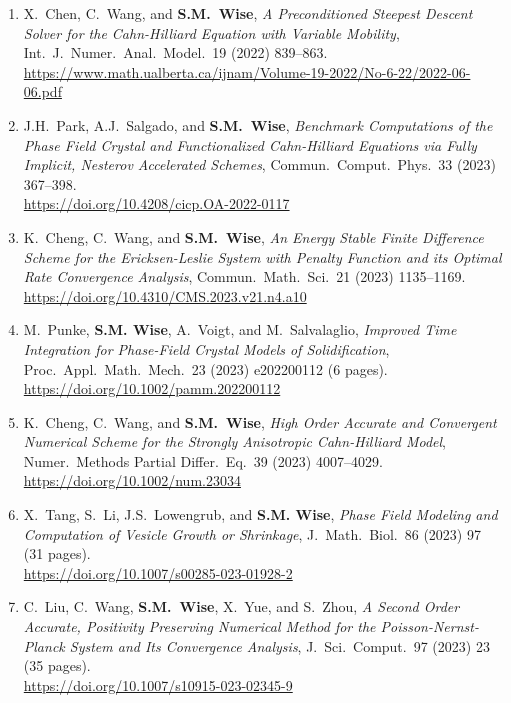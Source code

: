 \documentclass[10pt,letterpaper]{article}
\begin{document}
\begin{enumerate}
	\item
X.~Chen, C.~Wang, and \textbf{S.M.~Wise}, {\sl A Preconditioned Steepest Descent Solver for the Cahn-Hilliard Equation with Variable Mobility}, Int.~J.~Numer.~Anal.~Model.~19 (2022) 839--863.
	\\
\url{https://www.math.ualberta.ca/ijnam/Volume-19-2022/No-6-22/2022-06-06.pdf}

	\item
J.H.~Park, A.J.~Salgado, and \textbf{S.M.~Wise}, {\sl Benchmark Computations of the Phase Field Crystal and Functionalized Cahn-Hilliard Equations via Fully Implicit, Nesterov Accelerated Schemes}, Commun.~Comput.~Phys.~33 (2023) 367--398.
	\\
\url{https://doi.org/10.4208/cicp.OA-2022-0117}

	\item
K.~Cheng, C.~Wang, and \textbf{S.M.~Wise}, {\sl An Energy Stable Finite Difference Scheme for the Ericksen-Leslie System with Penalty Function and its Optimal Rate Convergence Analysis}, Commun.~Math.~Sci.~21 (2023)  1135--1169.
	\\
\url{https://doi.org/10.4310/CMS.2023.v21.n4.a10}

	\item
M.~Punke, \textbf{S.M. Wise}, A.~Voigt, and M.~Salvalaglio, {\sl Improved Time Integration for Phase-Field Crystal Models of Solidification}, Proc.~Appl.~Math.~Mech.~23 (2023) e202200112 (6 pages).
	\\
\url{https://doi.org/10.1002/pamm.202200112}

	\item
K.~Cheng, C.~Wang, and \textbf{S.M.~Wise}, {\sl High Order Accurate and Convergent Numerical Scheme for the Strongly Anisotropic Cahn-Hilliard Model}, Numer.~Methods Partial Differ.~Eq.~39 (2023) 4007--4029.
	\\
\url{https://doi.org/10.1002/num.23034}

	\item
X.~Tang, S.~Li, J.S.~Lowengrub, and \textbf{S.M. Wise}, {\sl Phase Field Modeling and Computation of Vesicle Growth or Shrinkage}, J.~Math.~Biol.~86 (2023) 97 (31 pages).
	\\
\url{https://doi.org/10.1007/s00285-023-01928-2}

	\item
C.~Liu, C.~Wang, \textbf{S.M.~Wise}, X.~Yue, and S.~Zhou, {\sl A Second Order Accurate, Positivity Preserving Numerical Method for the Poisson-Nernst-Planck System and Its Convergence Analysis}, J.~Sci.~Comput.~97 (2023) 23 (35 pages).
	\\
\url{https://doi.org/10.1007/s10915-023-02345-9}	


\end{enumerate}
\end{document}
